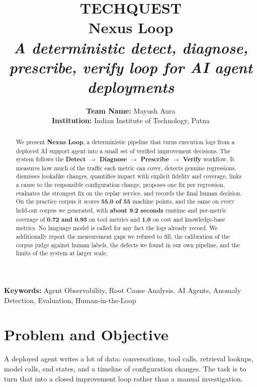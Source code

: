\documentclass[8pt,twocolumn,a4paper]{extarticle}
\title{
    \normalfont
    \normalsize
    \textsc{TECHQUEST} \\[3pt]
    \Large \textbf{Nexus Loop} \\[2pt]
    \normalsize
    \textit{A deterministic detect, diagnose, prescribe, verify loop for AI agent deployments}
}
\author{
    \textbf{Team Name:} Mayush Aura
    \\
    \textbf{Institution:} Indian Institute of Technology, Patna
}
\date{}
\begin{document}
\maketitle


\begin{abstract}

We present \textbf{Nexus Loop}, a deterministic pipeline that turns
execution logs from a deployed AI support agent into a small set of
verified improvement decisions. The system follows the
\textbf{Detect $\rightarrow$ Diagnose $\rightarrow$ Prescribe
$\rightarrow$ Verify} workflow. It measures how much of the traffic each
metric can cover, detects genuine regressions, dismisses lookalike
changes, quantifies impact with explicit fidelity and coverage, links a
cause to the responsible configuration change, proposes one fix per
regression, evaluates the strongest fix on the replay service, and
records the final human decision. On the practice corpus it scores
\textbf{55.0 of 55} machine points, and the same on every held-out
corpus we generated, with \textbf{about 9.2 seconds} runtime and
per-metric coverage of \textbf{0.72 and 0.93} on tool metrics and
\textbf{1.0} on cost and knowledge-base metrics. No language model is
called for any fact the logs already record. We additionally report the
measurement gaps we refused to fill, the calibration of the corpus judge
against human labels, the defects we found in our own pipeline, and the
limits of the system at larger scale.

\end{abstract}

\noindent
\textbf{Keywords:}
Agent Observability, Root Cause Analysis, AI Agents, Anomaly Detection,
Evaluation, Human-in-the-Loop


\section{Problem and Objective}

A deployed agent writes a lot of data: conversations, tool calls,
retrieval lookups, model calls, end states, and a timeline of
configuration changes. The task is to turn that into a closed
improvement loop rather than a manual investigation.
\end{document}
